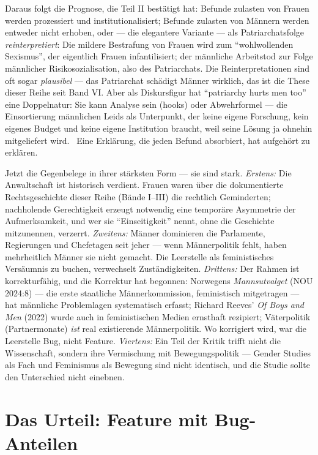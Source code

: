 Daraus folgt die Prognose, die Teil II bestätigt hat: Befunde zulasten von
Frauen werden prozessiert und institutionalisiert; Befunde zulasten von
Männern werden entweder nicht erhoben, oder --- die elegantere Variante ---
als Patriarchatsfolge \emph{reinterpretiert}: Die mildere Bestrafung von
Frauen wird zum \enquote{wohlwollenden Sexismus}, der eigentlich Frauen
infantilisiert; der männliche Arbeitstod zur Folge männlicher
Risikosozialisation, also des Patriarchats. Die Reinterpretationen sind oft
sogar \emph{plausibel} --- das Patriarchat schädigt Männer wirklich, das ist
die These dieser Reihe seit Band VI. Aber als Diskursfigur hat
\enquote{patriarchy hurts men too} eine Doppelnatur: Sie kann Analyse sein
(hooks) oder Abwehrformel --- die Einsortierung männlichen Leids als
Unterpunkt, der keine eigene Forschung, kein eigenes Budget und keine eigene
Institution braucht, weil seine Lösung ja ohnehin mitgeliefert wird.
\plausibel\ Eine Erklärung, die jeden Befund absorbiert, hat aufgehört zu
erklären.

\begin{gegen}
Jetzt die Gegenbelege in ihrer stärksten Form --- sie sind stark. \emph{Erstens:}
Die Anwaltschaft ist historisch verdient. Frauen waren über die dokumentierte
Rechtsgeschichte dieser Reihe (Bände I--III) die rechtlich Geminderten;
nachholende Gerechtigkeit erzeugt notwendig eine temporäre Asymmetrie der
Aufmerksamkeit, und wer sie \enquote{Einseitigkeit} nennt, ohne die Geschichte
mitzunennen, verzerrt. \emph{Zweitens:} Männer dominieren die Parlamente,
Regierungen und Chefetagen seit jeher --- wenn Männerpolitik fehlt, haben
mehrheitlich Männer sie nicht gemacht. Die Leerstelle als feministisches
Versäumnis zu buchen, verwechselt Zuständigkeiten. \emph{Drittens:} Der Rahmen
ist korrekturfähig, und die Korrektur hat begonnen: Norwegens
\textit{Mannsutvalget} (NOU 2024:8) --- die erste staatliche Männerkommission,
feministisch mitgetragen --- hat männliche Problemlagen systematisch erfasst;
Richard Reeves' \textit{Of Boys and Men} (2022) wurde auch in feministischen
Medien ernsthaft rezipiert; Väterpolitik (Partnermonate) \emph{ist} real
existierende Männerpolitik. Wo korrigiert wird, war die Leerstelle Bug, nicht
Feature. \emph{Viertens:} Ein Teil der Kritik trifft nicht die Wissenschaft,
sondern ihre Vermischung mit Bewegungspolitik --- Gender Studies als Fach und
Feminismus als Bewegung sind nicht identisch, und die Studie sollte den
Unterschied nicht einebnen.
\end{gegen}

\section{Das Urteil: Feature mit Bug-Anteilen}

